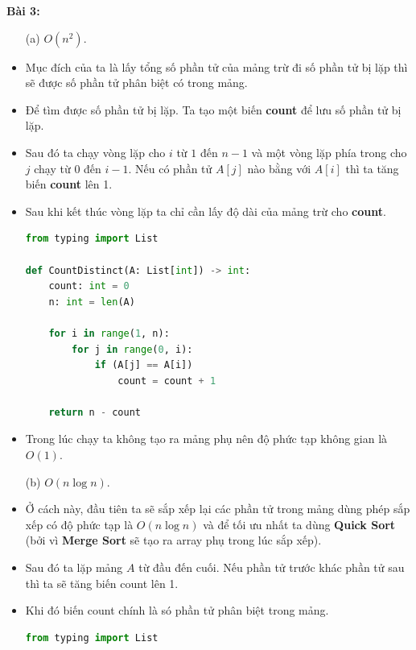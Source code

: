 \documentclass[12pt]{article}
\begin{document}
\textbf{Bài 3:} 
\begin{itemize}
    \item[(a)] $O(n^2)$.

    \item Mục đích của ta là lấy tổng số phần tử của mảng trừ đi số phần tử bị lặp thì sẽ được số phần tử phân biệt có trong mảng.

    \item Để tìm được số phần tử bị lặp. Ta tạo một biến \textbf{count} để lưu số phần tử bị lặp.

    \item Sau đó ta chạy vòng lặp cho $i$ từ $1$ đến $n-1$ và một vòng lặp phía trong cho $j$ chạy từ $0$ đến $i-1$. Nếu có phần tử $A[j]$ nào bằng với $A[i]$ thì ta tăng biến \textbf{count} lên 1.
    
    \item Sau khi kết thúc vòng lặp ta chỉ cần lấy độ dài của mảng trừ cho \textbf{count}.

\begin{lstlisting}[language=Python]
from typing import List

def CountDistinct(A: List[int]) -> int:
    count: int = 0
    n: int = len(A)

    for i in range(1, n):
        for j in range(0, i):
            if (A[j] == A[i]) 
                count = count + 1

    return n - count
\end{lstlisting}

\item Trong lúc chạy ta không tạo ra mảng phụ nên độ phức tạp không gian là $O(1)$.

\item[(b)] $O(n\log n)$.

\item Ở cách này, đầu tiên ta sẽ sắp xếp lại các phần tử trong mảng dùng phép sắp xếp có độ phức tạp là $O(n \log n)$ và để tối ưu nhất ta dùng \textbf{Quick Sort} (bởi vì \textbf{Merge Sort} sẽ tạo ra array phụ trong lúc sắp xếp).

\item Sau đó ta lặp mảng $A$ từ đầu đến cuối. Nếu phần tử trước khác phần tử sau thì ta sẽ tăng biến count lên 1.

\item Khi đó biến count chính là só phần tử phân biệt trong mảng.

\begin{lstlisting}[language=Python]
from typing import List


\end{lstlisting}
\end{itemize}
\end{document}
